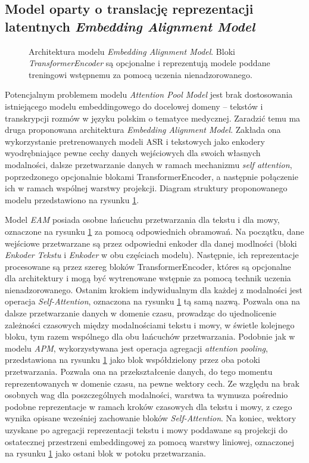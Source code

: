\subsection{Model oparty o translację reprezentacji latentnych \textit{Embedding Alignment Model}}
\begin{figure}[h]
    \caption{Architektura modelu \textit{Embedding Alignment Model}. Bloki \textit{TransformerEncoder} są opcjonalne i reprezentują modele poddane treningowi wstępnemu za pomocą uczenia nienadzorowanego.}
    \label{fig:eamArchitecture}
\end{figure}
Potencjalnym problemem modelu \textit{Attention Pool Model} jest brak dostosowania istniejącego modelu embeddingowego do docelowej domeny -- tekstów i transkrypcji rozmów w języku polskim o tematyce medycznej. Zaradzić temu ma druga proponowana architektura \textit{Embedding Alignment Model}. Zakłada ona wykorzystanie pretrenowanych modeli ASR i tekstowych jako enkodery wyodrębniające pewne cechy danych wejściowych dla swoich własnych modalności, dalsze przetwarzanie danych w ramach mechanizmu \textit{self attention}, poprzedzonego opcjonalnie blokami TransformerEncoder, a następnie połączenie ich w ramach wspólnej warstwy projekcji. Diagram struktury proponowanego modelu przedstawiono na rysunku \ref{fig:eamArchitecture}.

Model \textit{EAM} posiada osobne łańcuchu przetwarzania dla tekstu i dla mowy, oznaczone na rysunku \ref{fig:eamArchitecture} za pomocą odpowiednich obramowań. Na początku, dane wejściowe przetwarzane są przez odpowiedni enkoder dla danej modlności (bloki \textit{Enkoder Tekstu} i \textit{Enkoder} w obu częściach modelu). Następnie, ich reprezentacje procesowane są przez szereg bloków TransformerEncoder, któres są opcjonalne dla architektury i mogą być wytrenowane wstępnie za pomocą technik uczenia nienadzorowanego. Ostanim krokiem indywidualnym dla każdej z modalności jest operacja \textit{Self-Attention}, oznaczona na rysunku \ref{fig:eamArchitecture} tą samą nazwą. Pozwala ona na dalsze przetwarzanie danych w domenie czasu, prowadząc do ujednolicenie zależności czasowych między modalnościami tekstu i mowy, w świetle kolejnego bloku, tym razem wspólnego dla obu łańcuchów przetwarzania. Podobnie jak w modelu \textit{APM}, wykorzystywana jest operacja agregacji \textit{attention pooling}, przedstawiona na rysunku \ref{fig:eamArchitecture} jako blok współdzielony przez oba potoki przetwarzania. Pozwala ona na przekształcenie danych, do tego momentu reprezentowanych w domenie czasu, na pewne wektory cech. Ze względu na brak osobnych wag dla poszczególnych modalności, warstwa ta wymusza pośrednio podobne reprezentacje w ramach kroków czasowych dla tekstu i mowy, z czego wynika opisane wcześniej zachowanie bloków \textit{Self-Attention}. Na koniec, wektory uzyskane po agregacji reprezentacji tekstu i mowy poddawane są projekcji do ostatecznej przestrzeni embeddingowej za pomocą warstwy liniowej, oznaczonej na rysunku \ref{fig:eamArchitecture} jako ostani blok w potoku przetwarzania.

